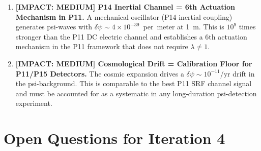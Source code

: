 \documentclass[11pt]{article}
\newcommand{\ee}[1]{\times 10^{#1}}
\begin{document}
\begin{enumerate}[leftmargin=*]
\item \textbf{[IMPACT: MEDIUM] P14 Inertial Channel = 6th Actuation Mechanism in P11.}
  A mechanical oscillator (P14 inertial coupling) generates psi-waves with
  $\delta\psi \sim 4\ee{-39}$~per~meter at 1~m. This is $10^9$ times stronger than
  the P11 DC electric channel and establishes a 6th actuation mechanism in the P11
  framework that does not require $\lambda \neq 1$.

\item \textbf{[IMPACT: MEDIUM] Cosmological Drift = Calibration Floor for P11/P15 Detectors.}
  The cosmic expansion drives a $\delta\psi \sim 10^{-11}$/yr drift in the
  psi-background. This is comparable to the best P11 SRF channel signal and must
  be accounted for as a systematic in any long-duration psi-detection experiment.

\end{enumerate}

\section{Open Questions for Iteration 4}
\label{sec:open-questions}
\end{document}
